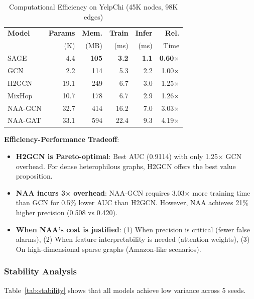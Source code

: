\begin{table}[t]
\centering
\caption{Computational Efficiency on YelpChi (45K nodes, 98K edges)}
\label{tab:efficiency}
\small
\begin{tabular}{lrrrrr}
\toprule
\textbf{Model} & \textbf{Params} & \textbf{Mem.} & \textbf{Train} & \textbf{Infer} & \textbf{Rel.} \\
 & (K) & (MB) & (ms) & (ms) & Time \\
\midrule
SAGE & 4.4 & \textbf{105} & \textbf{3.2} & \textbf{1.1} & \textbf{0.60$\times$} \\
GCN & 2.2 & 114 & 5.3 & 2.2 & 1.00$\times$ \\
H2GCN & 19.1 & 249 & 6.7 & 3.0 & 1.25$\times$ \\
MixHop & 10.7 & 178 & 6.7 & 2.9 & 1.26$\times$ \\
\midrule
NAA-GCN & 32.7 & 414 & 16.2 & 7.0 & 3.03$\times$ \\
NAA-GAT & 33.1 & 594 & 22.4 & 9.3 & 4.19$\times$ \\
\bottomrule
\end{tabular}
\end{table}

\textbf{Efficiency-Performance Tradeoff}:
\begin{itemize}
\item \textbf{H2GCN is Pareto-optimal}: Best AUC (0.9114) with only 1.25$\times$ GCN overhead. For dense heterophilous graphs, H2GCN offers the best value proposition.
\item \textbf{NAA incurs 3$\times$ overhead}: NAA-GCN requires 3.03$\times$ more training time than GCN for 0.5\% lower AUC than H2GCN. However, NAA achieves 21\% higher precision (0.508 vs 0.420).
\item \textbf{When NAA's cost is justified}: (1) When precision is critical (fewer false alarms), (2) When feature interpretability is needed (attention weights), (3) On high-dimensional sparse graphs (Amazon-like scenarios).
\end{itemize}

\subsubsection{Stability Analysis}

Table~\ref{tab:stability} shows that all models achieve low variance across 5 seeds.

